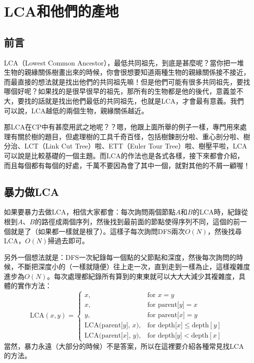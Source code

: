 \chapter{LCA和他們的產地}
	\section{前言}
	LCA（Lowest Common Ancestor），最低共同祖先，到底是甚麼呢？當你把一堆生物的親緣關係樹畫出來的時候，你會很想要知道兩種生物的親緣關係接不接近，而最直接的想法就是找出他們的共同祖先嘛！但是他們可能有很多共同祖先，要找哪個好呢？如果找的是很早很早的祖先，那所有的生物都是他的後代，意義並不大，要找的話就是找出他們最低的共同祖先，也就是LCA，才會最有意義。我們可以說，LCA越低的兩個生物，親緣關係越近。
	
	那LCA在CP中有甚麼用武之地呢？？嗯，他跟上面所舉的例子一樣，專門用來處理有關於樹的題目，但處理樹的工具千奇百怪，包括樹鍊剖分啦、重心剖分啦、樹分治、LCT（Link Cut Tree）啦、ETT（Euler Tour Tree）啦、樹壓平啦，LCA可以說是比較基礎的一個主題。而LCA的作法也是各式各樣，接下來都會介紹，而且每個都有每個的好處，千萬不要因為會了其中一個，就對其他的不屑一顧喔！
	
	\section{暴力做LCA}
		如果要暴力去做LCA，相信大家都會：每次詢問兩個節點$A$和$B$的LCA時，紀錄從根到$A$、$B$的路徑成兩個序列，然後找到最前面的節點使得序列不同，這個的前一個就是了（如果都一樣就是根了）。這樣子每次詢問DFS兩次$O(N)$，然後找尋LCA，$O(N)$掃過去即可。
		
		另外一個想法就是：DFS一次紀錄每一個點的父節點和深度，然後每次詢問的時候，不斷把深度小的（一樣就隨便）往上走一次，直到走到一樣為止，這樣複雜度進步為$O(N)$。每次處理都紀錄所有算到的東東就可以大大大減少其複雜度，具體的實作方法：
		$$\text{LCA}(x, y) = \begin{cases}
			x, &\text{for  } x = y\\
			x, &\text{for  } \text{parent[} y \text{]} = x\\
			y, &\text{for  } \text{parent[} x \text{]} = y\\
			\text{LCA(parent[} y \text{], } x \text{)}, &\text{for  } \text{depth[} x \text{]} \leq \text{depth}[y]\\
			\text{LCA(parent[} x \text{], } y \text{)}, &\text{for  } \text{depth[} y \text{]} < \text{depth}[x]
		\end{cases}$$		
		當然，暴力永遠（大部分的時候）不是答案，所以在這裡要介紹各種常見找LCA的方法。
